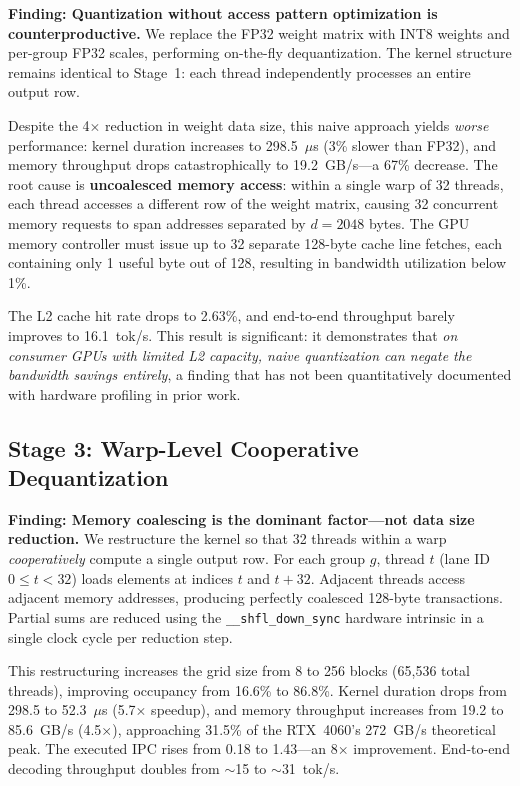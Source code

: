 \documentclass[conference]{IEEEtran}
\begin{document}
\textbf{Finding: Quantization without access pattern optimization is counterproductive.} We replace the FP32 weight matrix with INT8 weights and per-group FP32 scales, performing on-the-fly dequantization. The kernel structure remains identical to Stage~1: each thread independently processes an entire output row.

Despite the 4$\times$ reduction in weight data size, this naive approach yields \emph{worse} performance: kernel duration increases to 298.5~$\mu$s (3\% slower than FP32), and memory throughput drops catastrophically to 19.2~GB/s---a 67\% decrease. The root cause is \textbf{uncoalesced memory access}: within a single warp of 32 threads, each thread accesses a different row of the weight matrix, causing 32 concurrent memory requests to span addresses separated by $d=2048$ bytes. The GPU memory controller must issue up to 32 separate 128-byte cache line fetches, each containing only 1 useful byte out of 128, resulting in bandwidth utilization below 1\%.

The L2 cache hit rate drops to 2.63\%, and end-to-end throughput barely improves to 16.1~tok/s. This result is significant: it demonstrates that \emph{on consumer GPUs with limited L2 capacity, naive quantization can negate the bandwidth savings entirely}, a finding that has not been quantitatively documented with hardware profiling in prior work.

\subsection{Stage 3: Warp-Level Cooperative Dequantization}

\textbf{Finding: Memory coalescing is the dominant factor---not data size reduction.} We restructure the kernel so that 32 threads within a warp \emph{cooperatively} compute a single output row. For each group $g$, thread $t$ (lane ID $0 \leq t < 32$) loads elements at indices $t$ and $t+32$. Adjacent threads access adjacent memory addresses, producing perfectly coalesced 128-byte transactions. Partial sums are reduced using the \texttt{\_\_shfl\_down\_sync} hardware intrinsic in a single clock cycle per reduction step.

This restructuring increases the grid size from 8 to 256 blocks (65,536 total threads), improving occupancy from 16.6\% to 86.8\%. Kernel duration drops from 298.5 to 52.3~$\mu$s (5.7$\times$ speedup), and memory throughput increases from 19.2 to 85.6~GB/s (4.5$\times$), approaching 31.5\% of the RTX~4060's 272~GB/s theoretical peak. The executed IPC rises from 0.18 to 1.43---an 8$\times$ improvement. End-to-end decoding throughput doubles from $\sim$15 to $\sim$31~tok/s.
\end{document}
